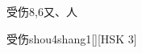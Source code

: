 \begin{entry}{受伤}{8,6}{⼜、⼈}
  \begin{phonetics}{受伤}{shou4shang1}[][HSK 3]
  \end{phonetics}
\end{entry}
